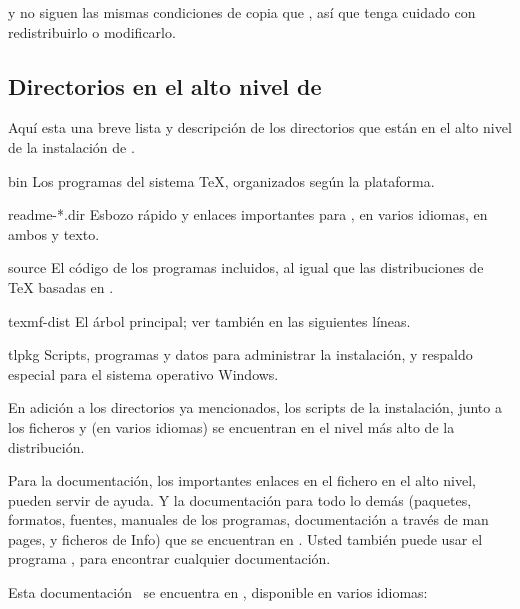 \documentclass{article}
\begin{document}
\CTAN{} y  no siguen las mismas condiciones de copia
que \TL{}, así que tenga cuidado con redistribuirlo o modificarlo. 

\subsection{Directorios en el alto nivel de \TL{}} \label{sec:tld}

Aquí esta una breve lista y descripción de los directorios que están
en el alto nivel de la instalación de \TL{}. 

\begin{ttdescription}
\item[bin] Los programas del sistema \TeX{}, organizados según la
	plataforma.
%
\item[readme-*.dir] Esbozo rápido y enlaces importantes para \TL{}, en
	varios idiomas, en ambos \HTML{} y texto. 
%
\item[source] El código de los programas incluidos, al igual que las
	distribuciones de \TeX{} basadas en \Webc{}.
%
\item[texmf-dist] El árbol principal; ver también \dirname[TEXMFDIST]
	en las siguientes líneas.
%
\item[tlpkg] Scripts, programas y datos para administrar la
	instalación, y respaldo especial para el sistema operativo
	Windows.
%
\end{ttdescription}

En adición a los directorios ya mencionados, los scripts de la
instalación, junto a los ficheros  y 
(en varios idiomas) se encuentran en el nivel más alto de la
distribución.

Para la documentación, los importantes enlaces en el fichero
 en el alto nivel, pueden servir de ayuda. Y la
documentación para todo lo demás (paquetes, formatos, fuentes,
manuales de los programas, documentación a través de man pages, y
ficheros de Info) que se encuentran en . Usted
también puede usar el programa , para encontrar
cualquier documentación.

Esta documentación \TL\ se encuentra en
, disponible en varios idiomas:
\end{document}
